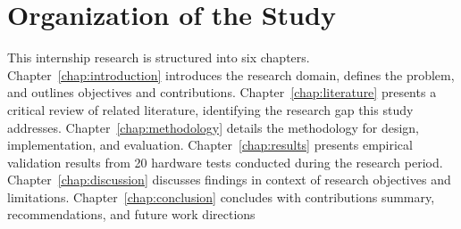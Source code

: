 \section{Organization of the Study}

This internship research is structured into six chapters. Chapter~\ref{chap:introduction} introduces the research domain, defines the problem, and outlines objectives and contributions. Chapter~\ref{chap:literature} presents a critical review of related literature, identifying the research gap this study addresses. Chapter~\ref{chap:methodology} details the methodology for design, implementation, and evaluation. Chapter~\ref{chap:results} presents empirical validation results from 20 hardware tests conducted during the research period. Chapter~\ref{chap:discussion} discusses findings in context of research objectives and limitations. Chapter~\ref{chap:conclusion} concludes with contributions summary, recommendations, and future work directions 
